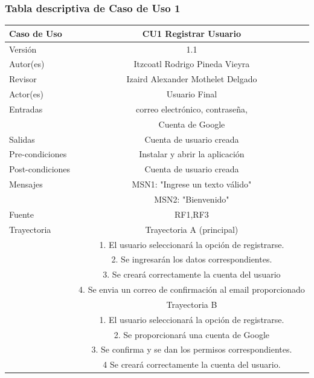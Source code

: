 \documentclass{article}
\begin{document}
\subsubsection{Tabla descriptiva de Caso de Uso 1}
\begin{tabular}{|M{5cm}|c|}
\hline
Caso de Uso & CU1 Registrar Usuario\\ \hline
Versión & 1.1\\ \hline
Autor(es) & Itzcoatl Rodrigo Pineda Vieyra\\ \hline
Revisor & Izaird Alexander Mothelet Delgado \\ \hline
Actor(es) & Usuario Final \\ \hline
Entradas & correo electrónico, contraseña, \\ & Cuenta de Google \\ \hline
Salidas & Cuenta de usuario creada \\ \hline
Pre-condiciones & Instalar y abrir la aplicación \\ \hline
Post-condiciones & Cuenta de usuario creada\\ \hline
Mensajes & MSN1: "Ingrese un texto válido"\\
		 & MSN2: "Bienvenido"\\ \hline
Fuente & RF1,RF3 \\ \hline	
	Trayectoria & Trayectoria A (principal)\\
		& 1.   El usuario seleccionará la opción de registrarse.\\
		& 2.   Se ingresarán los datos correspondientes.\\
		& 3.   Se creará correctamente la cuenta del usuario\\
		& 4.   Se envia un correo de confirmación al email proporcionado \\	
	& Trayectoria B\\
	& 1.   El usuario seleccionará la opción de registrarse.\\
	& 2.   Se proporcionará una cuenta de Google\\
	& 3.   Se confirma y se dan los permisos correspondientes.\\
	& 4   Se creará correctamente la cuenta del usuario.\\ \hline
\end{tabular}
\end{document}
